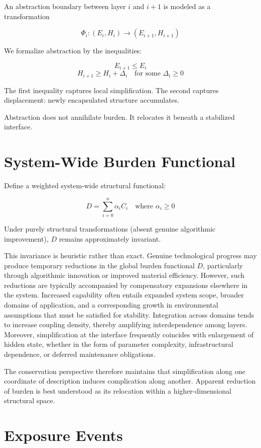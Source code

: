 \documentclass[11pt,openany]{book}
\begin{document}
An abstraction boundary between layer $i$ and $i+1$ 
is modeled as a transformation

\[
\Phi_i : (E_i, H_i) \longrightarrow (E_{i+1}, H_{i+1})
\]

We formalize abstraction by the inequalities:

\[
E_{i+1} \leq E_i
\]
\[
H_{i+1} \geq H_i + \Delta_i
\quad \text{for some } \Delta_i \geq 0
\]

The first inequality captures local simplification.
The second captures displacement: newly encapsulated structure accumulates.

Abstraction does not annihilate burden.
It relocates it beneath a stabilized interface.

\section{System-Wide Burden Functional}

Define a weighted system-wide structural functional:

\[
D = \sum_{i=0}^{n} \alpha_i C_i
\quad \text{where } \alpha_i \geq 0
\]

Under purely structural transformations (absent genuine algorithmic improvement),
$D$ remains approximately invariant.

This invariance is heuristic rather than exact. Genuine technological progress 
may produce temporary reductions in the global burden functional $D$, particularly 
through algorithmic innovation or improved material efficiency. However, such 
reductions are typically accompanied by compensatory expansions elsewhere in the 
system. Increased capability often entails expanded system scope, broader domains 
of application, and a corresponding growth in environmental assumptions that must 
be satisfied for stability. Integration across domains tends to increase coupling 
density, thereby amplifying interdependence among layers. Moreover, simplification 
at the interface frequently coincides with enlargement of hidden state, whether 
in the form of parameter complexity, infrastructural dependence, or deferred 
maintenance obligations.

The conservation perspective therefore maintains that simplification along one 
coordinate of description induces complication along another. Apparent reduction 
of burden is best understood as its relocation within a higher-dimensional 
structural space.

\section{Exposure Events}
\end{document}

